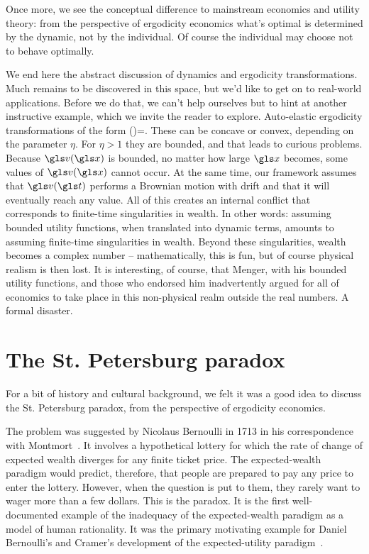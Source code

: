 Once more, we see the conceptual difference to mainstream economics and utility theory:
from the perspective of ergodicity economics what's optimal is determined by the dynamic, 
not by the individual. Of course the individual may choose not to behave optimally. 

We end here the abstract discussion of dynamics and ergodicity transformations. Much remains to be discovered
in this space, but we'd like to get on to real-world applications. Before we do that, we 
can't help ourselves but to hint at another instructive example, which we invite the 
reader to explore. Auto-elastic ergodicity transformations of the form
\be
\gv(\x)=.
\ee
These can be concave or convex, depending on the parameter $\eta$. For $\eta>1$
they are bounded, and that leads to curious problems. Because $\gv(\x)$ is bounded, 
no matter how large $\x$ becomes, some values of $\gv(\x)$ cannot occur. 
At the same time, our framework assumes that $\gv(\t)$
performs a Brownian motion with drift and that it will eventually reach any value. 
All of this creates an internal conflict that corresponds
to finite-time singularities in wealth. In other words: assuming bounded utility functions, 
when translated into dynamic terms, amounts to assuming finite-time singularities in wealth.
Beyond these singularities, wealth becomes a complex number -- mathematically, this is
fun, but of course physical realism is then lost. It is interesting, of course, that 
Menger, with his bounded utility functions, and those who endorsed him inadvertently 
argued for all of economics to take place in this non-physical realm outside the real 
numbers. A formal disaster.

\section{The St. Petersburg paradox}
For a bit of history and cultural background, we felt it was a good idea to discuss the 
St. Petersburg paradox, from the perspective of ergodicity economics.

The problem was suggested by Nicolaus 
Bernoulli
in 1713 in his 
correspondence with Montmort~\cite{Montmort1713}. 
It involves a hypothetical 
lottery for which the rate of change of expected wealth diverges for any finite ticket 
price. The expected-wealth paradigm would predict, therefore, that people are 
prepared to pay any price to enter the lottery. However, when the question is put 
to them, they rarely want to wager more than a few dollars. This 
is the paradox. It is the first well-documented example of the inadequacy of the 
expected-wealth paradigm as a model of human rationality. It was the primary 
motivating example for Daniel Bernoulli's and Cramer's development of the 
expected-utility paradigm~\cite{Bernoulli1738}.


